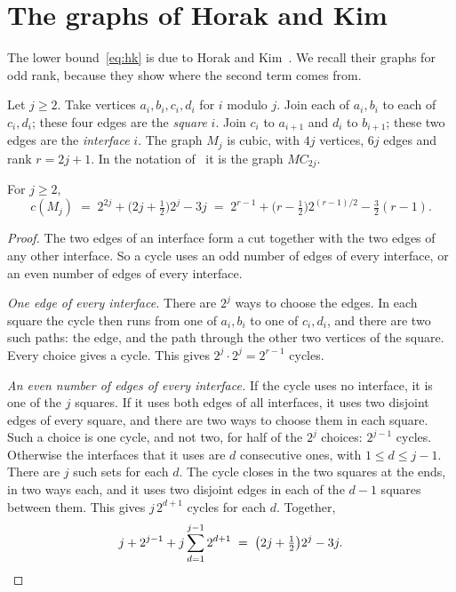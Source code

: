 \section{The graphs of Horak and Kim}\label{sec:examples}

The lower bound~\eqref{eq:hk} is due to Horak and Kim~\cite[Theorem~5.1]{HK}. We recall their
graphs for odd rank, because they show where the second term comes from.

Let $j\ge2$. Take vertices $a_i,b_i,c_i,d_i$ for $i$ modulo $j$. Join each of $a_i,b_i$ to each of
$c_i,d_i$; these four edges are the \emph{square} $i$. Join $c_i$ to $a_{i+1}$ and $d_i$ to
$b_{i+1}$; these two edges are the \emph{interface} $i$. The graph $M_j$ is cubic, with $4j$
vertices, $6j$ edges and rank $r=2j+1$. In the notation of~\cite{HK} it is the graph $MC_{2j}$.

\begin{proposition}\label{prop:hk}
For $j\ge2$,
\[
  c(M_j)\;=\;2^{2j}+\bigl(2j+\tfrac12\bigr)2^{j}-3j\;=\;2^{r-1}+\bigl(r-\tfrac12\bigr)2^{(r-1)/2}-\tfrac32(r-1).
\]
\end{proposition}

\begin{proof}
The two edges of an interface form a cut together with the two edges of any other interface. So a
cycle uses an odd number of edges of every interface, or an even number of edges of every
interface.

\emph{One edge of every interface.} There are $2^{j}$ ways to choose the edges. In each square the
cycle then runs from one of $a_i,b_i$ to one of $c_i,d_i$, and there are two such paths: the edge,
and the path through the other two vertices of the square. Every choice gives a cycle. This gives
$2^{j}\cdot2^{j}=2^{r-1}$ cycles.

\emph{An even number of edges of every interface.} If the cycle uses no interface, it is one of the
$j$ squares. If it uses both edges of all interfaces, it uses two disjoint edges of every square,
and there are two ways to choose them in each square. Such a choice is one cycle, and not two, for
half of the $2^{j}$ choices: $2^{j-1}$ cycles. Otherwise the interfaces that it uses are $d$
consecutive ones, with $1\le d\le j-1$. There are $j$ such sets for each $d$. The cycle closes in
the two squares at the ends, in two ways each, and it uses two disjoint edges in each of the
$d-1$ squares between them. This gives $j\,2^{d+1}$ cycles for each $d$. Together,
\[
  j+2^{j-1}+j\sum_{d=1}^{j-1}2^{d+1}\;=\;\bigl(2j+\tfrac12\bigr)2^{j}-3j .\qedhere
\]
\end{proof}

